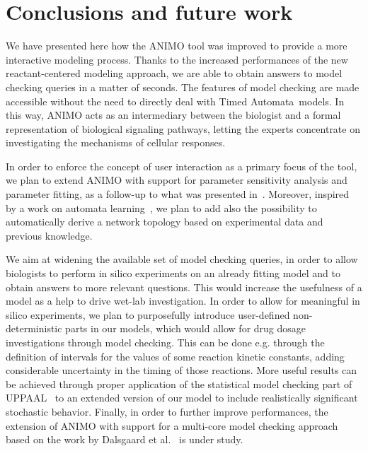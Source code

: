 \documentclass{llncs}
\newcommand{\tas}{Timed Automata}
\begin{document}
\section{Conclusions and future work}\label{sec:conclusion}
We have presented here how the ANIMO tool 
was improved to provide a more interactive modeling process.
Thanks to the increased performances of the new reactant-centered modeling approach,
we are able to obtain answers to model checking queries in a matter of seconds.
The features
of model checking are made accessible without the need to directly deal with \tas\ models.
In this way, ANIMO acts as an intermediary between the biologist and a formal
representation of biological signaling pathways, letting the experts concentrate
on investigating the mechanisms of cellular responses.

In order to enforce the concept of user interaction as a primary focus of the tool, we plan to extend
ANIMO with support for parameter sensitivity analysis and parameter fitting,
as a follow-up to what was presented in~\cite{animo-syncop}.
Moreover, inspired by a work on automata learning~\cite{test-based-modelling}, we plan to add also the possibility
to automatically derive a network topology based on experimental data and 
previous knowledge.

We aim at widening the available set of model checking queries, in order to allow biologists to perform
in silico experiments on an already fitting model and to obtain answers to more relevant questions.
This would increase the usefulness of a model as a help to drive wet-lab investigation.
In order to allow for meaningful in silico experiments, we plan to purposefully introduce user-defined non-deterministic 
parts in our models, which would allow for drug dosage investigations through model checking.
This can be done e.g. through the definition of intervals for the values of some reaction kinetic constants,
adding considerable uncertainty in the timing of those reactions.
More useful results can be achieved through proper application of the statistical model checking part of UPPAAL~\cite{uppaal-smc} to
an extended version of our model to include realistically significant stochastic behavior.
Finally, in order to further improve performances, the extension of ANIMO with support for a multi-core model checking approach based on the
work by Dalsgaard et al.~\cite{uppaal-multi-core1}
is under study.
\end{document}
